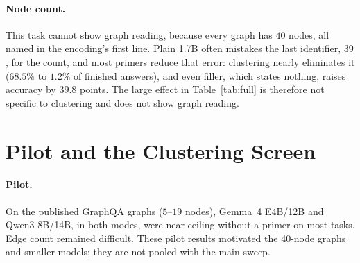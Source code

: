 \documentclass[11pt]{article}
\begin{document}
\paragraph{Node count.} This task cannot show graph reading, because every graph has $40$ nodes, all named in the encoding's first line. Plain 1.7B often mistakes the last identifier, $39$, for the count, and most primers reduce that error: clustering nearly eliminates it ($68.5\%$ to $1.2\%$ of finished answers), and even filler, which states nothing, raises accuracy by $39.8$ points. The large effect in Table~\ref{tab:full} is therefore not specific to clustering and does not show graph reading. %

\clearpage
\section{Pilot and the Clustering Screen}
\label{app:pilot}
\paragraph{Pilot.} On the published GraphQA graphs ($5$--$19$ nodes), Gemma~4 E4B/12B \citep{gemma4} and Qwen3-8B/14B, in both modes, were near ceiling without a primer on most tasks. Edge count remained difficult. These pilot results motivated the 40-node graphs and smaller models; they are not pooled with the main sweep.
\end{document}
